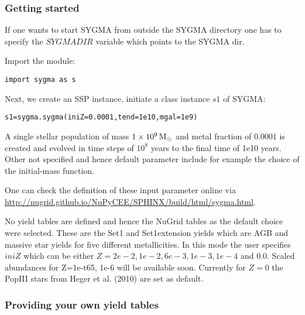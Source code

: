 \subsubsection{Getting started}

If one wants to start SYGMA from outside the SYGMA directory
one has to specify the $SYGMADIR$ variable which
points to the SYGMA dir.

Import the module:

\begin{verbatim}
import sygma as s
\end{verbatim}

Next, we create an SSP instance, initiate a class instance $s1$ of SYGMA:


\begin{verbatim}
s1=sygma.sygma(iniZ=0.0001,tend=1e10,mgal=1e9)
\end{verbatim}

A single stellar population of mass $1\times10^{9}\, {\rm M}_\odot$ and metal fraction
of $0.0001$ is created and evolved in time steps of $10^{8}$ years
to the final time of 1e10 years. Other not specified and hence
default parameter include for example the choice of the initial-mass function.


One can check the definition of these input parameter online via
\url{http://nugrid.github.io/NuPyCEE/SPHINX/build/html/sygma.html}.


No yield tables are defined and hence the NuGrid tables as the
default choice were selected. These are the Set1 and Set1extension
yields which are
AGB and massive star yields for five different metallicities.
In this mode the user specifies $iniZ$
which can be either $Z=2e-2, 1e-2, 6e-3, 1e-3, 1e-4$ and $0.0$.
Scaled abundances for Z=1e-t65, 1e-6 will be available soon.
Currently for $Z=0$ the PopIII stars from Heger et al. (2010) are set
as default.

\subsubsection{Providing your own yield tables}


